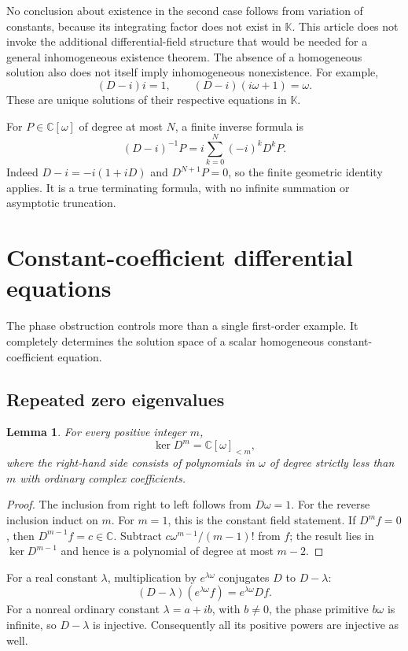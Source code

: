 \documentclass[11pt,a4paper]{article}
\numberwithin{equation}{section}
\newtheorem{lemma}[theorem]{Lemma}
\theoremstyle{definition}
\theoremstyle{remark}
\newcommand{\K}{\mathbb K}
\newcommand{\C}{\mathbb C}
\begin{document}
No conclusion about existence in the second case follows from variation of
constants, because its integrating factor does not exist in $\K$. This
article does not invoke the additional differential-field structure that
would be needed for a general inhomogeneous existence theorem. The absence
of a homogeneous solution also does not itself imply inhomogeneous
nonexistence. For example,
\[
 (D-i)i=1,\qquad (D-i)(i\omega+1)=\omega.
\]
These are unique solutions of their respective equations in $\K$.

For $P\in\C[\omega]$ of degree at most $N$, a finite inverse formula is
\begin{equation}\label{eq:poly-inverse}
 (D-i)^{-1}P
 =i\sum_{k=0}^{N}(-i)^kD^kP.
\end{equation}
Indeed $D-i=-i(1+iD)$ and $D^{N+1}P=0$, so the finite geometric identity
applies. It is a true terminating formula, with no infinite summation or
asymptotic truncation.

\section{Constant-coefficient differential equations}
\label{sec:constant-ODE}

The phase obstruction controls more than a single first-order example.
It completely determines the solution space of a scalar homogeneous
constant-coefficient equation.

\subsection{Repeated zero eigenvalues}

\begin{lemma}\label{lem:Dpowers}
For every positive integer $m$,
\[
 \ker D^m=\C[\omega]_{<m},
\]
where the right-hand side consists of polynomials in $\omega$ of degree
strictly less than $m$ with ordinary complex coefficients.
\end{lemma}
\begin{proof}
The inclusion from right to left follows from $D\omega=1$.
For the reverse inclusion induct on $m$. For $m=1$, this is the constant
field statement. If $D^mf=0$, then $D^{m-1}f=c\in\C$. Subtract
$c\omega^{m-1}/(m-1)!$ from $f$; the result lies in $\ker D^{m-1}$ and
hence is a polynomial of degree at most $m-2$.
\end{proof}

For a real constant $\lambda$, multiplication by $e^{\lambda\omega}$
conjugates $D$ to $D-\lambda$:
\begin{equation}\label{eq:conjugate}
 (D-\lambda)(e^{\lambda\omega}f)=e^{\lambda\omega}Df.
\end{equation}
For a nonreal ordinary constant $\lambda=a+ib$, with $b\ne0$, the phase
primitive $b\omega$ is infinite, so $D-\lambda$ is injective. Consequently
all its positive powers are injective as well.
\end{document}
